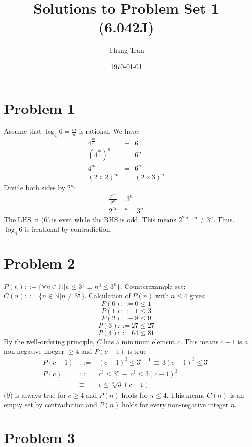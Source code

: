 \documentclass[12pt]{article}
\begin{document}
\title{\textbf{Solutions to Problem Set 1 (6.042J)}}
\author{Thang Tran}
\date{\today}
\maketitle
\section*{Problem 1}

Assume that $\log_4{6}=\frac{m}{n}$ is rational. We have:
\begin{eqnarray}
4^{\frac{m}{n}}&=&6\\
(4^{\frac{m}{n}})^n&=&6^n \\
4^m&=&6^n \\
(2\times2)^m&=&(2\times3)^n
\end{eqnarray}
Divide both sides by $2^n$:
\begin{eqnarray}
\frac{2^{2m}}{2^n}=3^n \\
2^{2m-n} = 3^n 
\end{eqnarray}
The LHS in (6) is even while the RHS is odd. This means $2^{2m-n} \neq 3^n$. Thus, $\log_4{6}$ is irrational by contradiction.

\section*{Problem 2}
$P(n)::=\{\forall n \in \mathbb{N}|n \leq 3^{\frac{n}{3}}\equiv n^3 \leq 3^n\}$. Counterexample set: $C(n)::=\{ n \in \mathbb{N}|n \neq 3^{\frac{n}{3}}\}$. Calculation of $P(n)$ with $n\leq 4$ gives:
$$ P(0) ::= 0\leq 1$$
$$ P(1) ::= 1\leq 3$$
$$ P(2) ::= 8\leq 9$$
$$ P(3) ::= 27\leq 27$$
$$ P(4) ::= 64 \leq 81$$
By the well-ordering principle, $C$ has a minimum element $c$. This means $c-1$  is a non-negative integer $\geq 4$ and $P(c-1)$ is true
\begin{eqnarray}
P(c-1)&::=&(c-1)^3 \leq 3^{c-1} \,\equiv\, 3(c-1)^3 \leq 3^c\\
P(c)&::=&c^3\leq 3^c \,\equiv\, c^3 \leq 3(c-1)^3  \\
&\equiv\,& c\leq \sqrt[3]{3}(c-1) 
\end{eqnarray}
(9) is always true for $c\geq4$ and $P(n)$ holds for $n\leq4$. This means $C(n)$ is an empty set by contradiction and $P(n)$ holds for every non-negative integer $n$.\\
 
\section*{Problem 3}
\end{document}

